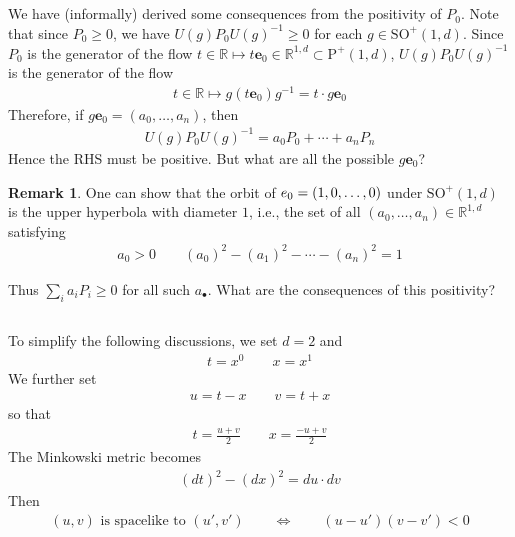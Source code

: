 \documentclass[12pt,b5paper,notitlepage]{article}
\theoremstyle{definition}
\newtheorem{rem}[df]{Remark}
\theoremstyle{plain}
\newcommand{\mbf}{\mathbf}
\newcommand{\blt}{\bullet}
\newcommand{\Rbb}{\mathbb R}
\newcommand{\Poid}{{\mathrm P}^+(1,d)}
\newcommand{\ebf}{\mathbf e}
\newcommand{\SO}{\mathrm{SO}}
\numberwithin{equation}{section}
\begin{document}
\subsection{}\label{lb2}


We have (informally) derived some consequences from the positivity of $P_0$.  Note that since $P_0\geq0$, we have $U(g)P_0U(g)^{-1}\geq0$ for each $g\in\SO^+(1,d)$. Since $P_0$ is the generator of the flow $t\in\Rbb\mapsto t\ebf_0\in\Rbb^{1,d}\subset\Poid$, $U(g)P_0U(g)^{-1}$ is the generator of the flow
\begin{align}
t\in\Rbb\mapsto g(t\ebf_0)g^{-1}=t\cdot g\ebf_0
\end{align}
Therefore, if $g\mbf e_0=(a_0,\dots,a_n)$, then
\begin{align}
U(g)P_0U(g)^{-1}=a_0P_0+\cdots+a_nP_n
\end{align}
Hence the RHS must be positive. But what are all the possible $g\ebf_0$?

\begin{rem}
One can show that the orbit of $\mbf \ebf_0=(1,0,\dots,0)$ under $\mathrm{SO}^+(1,d)$ is the upper hyperbola with diameter $1$, i.e., the set of all $(a_0,\dots,a_n)\in\Rbb^{1,d}$ satisfying
\begin{align}
a_0>0\qquad (a_0)^2-(a_1)^2-\cdots-(a_n)^2=1
\end{align}
\end{rem}

Thus $\sum_i a_iP_i\geq0$ for all such $a_\blt$. What are the consequences of this positivity?



\subsection{}\label{lb12}



To simplify the following discussions, we set $d=2$ and
\begin{align*}
t=x^0\qquad x=x^1
\end{align*}
We further set
\begin{align}
u=t-x\qquad v=t+x
\end{align}
so that
\begin{align}
t=\frac{u+v}2\qquad x=\frac{-u+v}2
\end{align}
The Minkowski metric becomes
\begin{align}
\boxed{~(dt)^2-(dx)^2=du\cdot dv~}
\end{align}
Then 
\begin{align}
(u,v)\text{ is spacelike to }(u',v')\qquad\Longleftrightarrow\qquad (u-u')(v-v')<0
\end{align}
\end{document}

